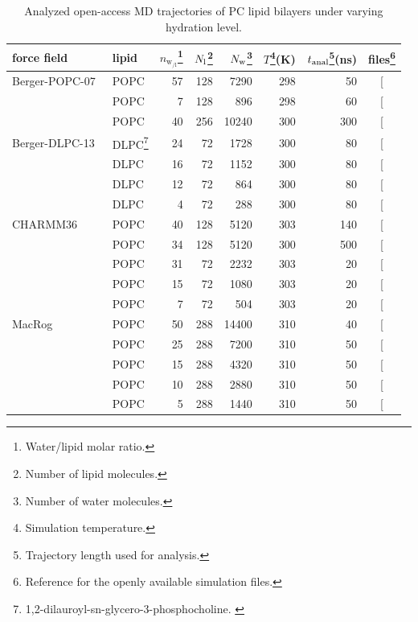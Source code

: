 \documentclass[journal=jcisd8,manuscript=article,layout=twocolumn]{achemso}
\begin{document}
\begin{table}[]
\caption{Analyzed open-access MD trajectories of PC lipid bilayers under varying hydration level.}
\begin{minipage}[t]{\columnwidth}
\resizebox{\columnwidth}{!} {
\begin{tabular}{llrrrrrc}
force field  &
lipid  &
$n_{{\mathrm w\!}_{/\mathrm l}}$\footnote{Water/lipid molar ratio.}  &
$N_{\rm l}$\footnote{Number of lipid molecules.}  &
$N_{\rm w}$\footnote{Number of water molecules.} &
$T$\footnote{Simulation temperature.}(K)  &
$t_{{\rm anal}}$\footnote{Trajectory length used for analysis.}(ns) &
files\footnote{Reference for the openly available simulation files.} \tabularnewline
\hline 
Berger-POPC-07~\cite{ollila07a} 
	& POPC  & 57  & 128  & 7290  & 298  & 50 & {[}\!\!\citenum{bergerFILESpopc}{]} \tabularnewline
	& POPC  & 7  & 128  & 896  & 298  & 60  & {[}\!\!\citenum{bergerDEHYDfiles}{]} \tabularnewline	
	& POPC & 40 & 256 & 10240 & 300 & 300  & {[}\!\!\citenum{bergerFILESpopcT300}{]} \tabularnewline[1.0ex]		
Berger-DLPC-13~\cite{kanduc13}
	& DLPC\footnote{1,2-dilauroyl-sn-glycero-3-phosphocholine. \label{fn:DLPC}}  & 24  & 72  & 1728  & 300  & 80  & {[}\!\!\citenum{bergerFILESdlpc24}{]} \tabularnewline
	& DLPC\footref{fn:DLPC}  & 16  & 72  & 1152  & 300  & 80  & {[}\!\!\citenum{bergerFILESdlpc16}{]} \tabularnewline
	& DLPC\footref{fn:DLPC}  & 12  & 72  & 864  & 300  & 80  & {[}\!\!\citenum{bergerFILESdlpc12}{]} \tabularnewline
	& DLPC\footref{fn:DLPC}  & 4  & 72  & 288  & 300  & 80  & {[}\!\!\citenum{bergerFILESdlpc4}{]} \tabularnewline[1.0ex]
	
CHARMM36\cite{klauda10} 
	& POPC  & 40  & 128  & 5120  & 303  & 140 & {[}\!\!\citenum{charmm36files}{]} \tabularnewline
	& POPC  & 34	&  128  & 5120 & 300 & 500  & {[}\!\!\citenum{macrogfilesT300}{]}\tabularnewline[1.0ex]	
	& POPC  & 31 & 72 & 2232 & 303 & 20 & {[}\!\!\citenum{charmm36files31wPERl}{]}\tabularnewline[1.0ex]	
	& POPC  & 15  & 72  & 1080  & 303  & 20  & {[}\!\!\citenum{charmm36files15wPERl}{]} \tabularnewline
	& POPC  & 7  & 72  & 504  & 303  & 20  & {[}\!\!\citenum{charmm36files7wPERl}{]} \tabularnewline[1.0ex]
MacRog\cite{kulig15} 
	& POPC  & 50  & 288  & 14400  & 310  & 40  & {[}\!\!\citenum{macrogdehydFILES}{]} \tabularnewline
	& POPC  & 25  & 288  & 7200  & 310  & 50  & {[}\!\!\citenum{macrogdehydFILES}{]} \tabularnewline	
	& POPC  & 15  & 288  & 4320  & 310  & 50 & {[}\!\!\citenum{macrogdehydFILES}{]} \tabularnewline
	& POPC  & 10  & 288  & 2880  & 310  & 50  & {[}\!\!\citenum{macrogdehydFILES}{]} \tabularnewline
	& POPC  & 5  & 288  & 1440  & 310  & 50  & {[}\!\!\citenum{macrogdehydFILES}{]} \tabularnewline
\end{tabular}
}
\label{tab:hydr}
\end{minipage}

\end{table}
\end{document}
